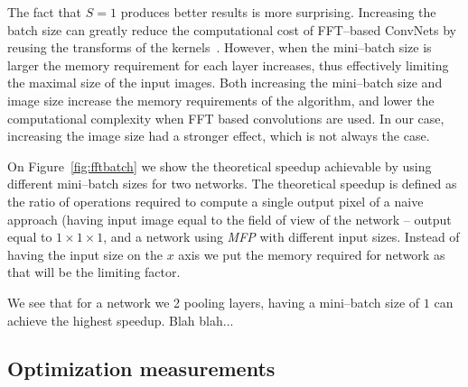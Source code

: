 \documentclass[conference]{./IEEEtran/IEEEtran}
\begin{document}
  The fact that $S=1$ produces better results is more surprising.
  Increasing the batch size can greatly reduce the computational cost
  of FFT--based ConvNets by reusing the transforms of the
  kernels~\cite{mathieu-iclr-14,vasilache2014fast}.  However, when the
  mini--batch size is larger the memory requirement for each layer
  increases, thus effectively limiting the maximal size of the input
  images.  Both increasing the mini--batch size and image size
  increase the memory requirements of the algorithm, and lower the
  computational complexity when FFT based convolutions are used.  In
  our case, increasing the image size had a stronger effect, which is
  not always the case.

  On Figure~\ref{fig:fftbatch} we show the theoretical speedup
  achievable by using different mini--batch sizes for two networks.
  The theoretical speedup is defined as the ratio of operations
  required to compute a single output pixel of a naive approach
  (having input image equal to the field of view of the network --
  output equal to $1 \times 1 \times 1$, and a network using
  \emph{MFP} with different input sizes.  Instead of having the input
  size on the $x$ axis we put the memory required for network as that
  will be the limiting factor.

  We see that for a network we 2 pooling layers, having a mini--batch
  size of $1$ can achieve the highest speedup.  Blah blah...


\subsection{Optimization measurements}


\end{document}
